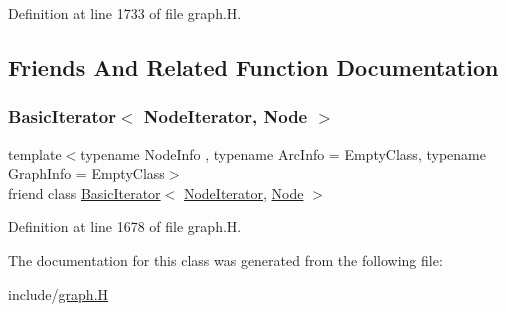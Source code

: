 Definition at line 1733 of file graph.\+H.



\subsection{Friends And Related Function Documentation}
\mbox{\label{class_designar_1_1_digraph_1_1_node_iterator_a21dc6ae614d097ff896e9e8e422d8f3c}} 
\subsubsection{\texorpdfstring{Basic\+Iterator$<$ Node\+Iterator, Node $>$}{BasicIterator< NodeIterator, Node >}}
{\footnotesize\ttfamily template$<$typename Node\+Info , typename Arc\+Info  = Empty\+Class, typename Graph\+Info  = Empty\+Class$>$ \\
friend class \hyperlink{class_designar_1_1_basic_iterator}{Basic\+Iterator}$<$ \hyperlink{class_designar_1_1_digraph_1_1_node_iterator}{Node\+Iterator}, \hyperlink{class_designar_1_1_digraph_a4dc921c41a480b7946a04170e997d8ae}{Node} $>$\hspace{0.3cm}{\ttfamily [friend]}}



Definition at line 1678 of file graph.\+H.



The documentation for this class was generated from the following file\+:\begin{DoxyCompactItemize}
\item 
include/\hyperlink{graph_8_h}{graph.\+H}\end{DoxyCompactItemize}
